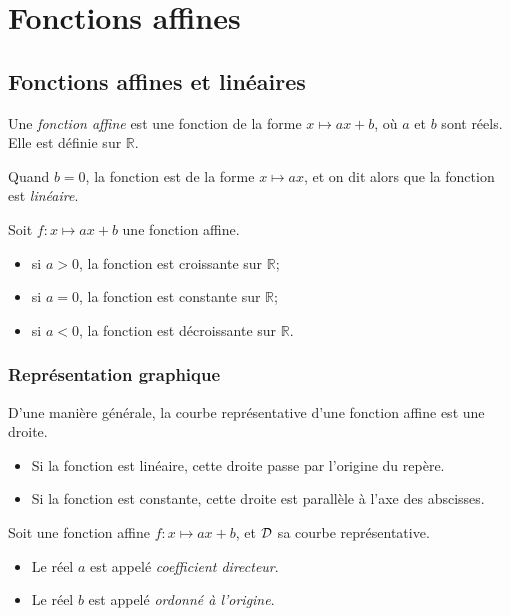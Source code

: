 \chapter{Fonctions affines}
\section{Fonctions affines et linéaires}

\begin{definition}
  Une \emph{fonction affine} est une fonction de la forme $x\mapsto ax+b$, où $a$ et $b$ sont réels. Elle est définie sur $\mathbb R$.

  Quand $b=0$, la fonction est de la forme $x\mapsto ax$, et on dit alors que la fonction est \emph{linéaire}.
\end{definition}

\begin{propriete}
  Soit $f:x\mapsto ax+b$ une fonction affine.
  \begin{itemize}
    \item si $a>0$, la fonction est croissante sur $\mathbb R$;
    \item si $a=0$, la fonction est constante sur $\mathbb R$;
    \item si $a<0$, la fonction est décroissante sur $\mathbb R$.
  \end{itemize}
\end{propriete}

\subsection{Représentation graphique}

\begin{propriete}D'une manière générale, la courbe représentative d'une
  fonction affine est une droite.

  \begin{itemize}
    \item Si la fonction est linéaire, cette droite passe par l'origine du repère.
    \item Si la fonction est constante, cette droite est parallèle à l'axe des abscisses.
    \end{itemize}
\end{propriete}

\begin{definition}Soit une fonction affine $f:x\mapsto ax+b$, et $\cal D$ sa courbe représentative.
  \begin{itemize}
    \item Le réel $a$ est appelé \emph{coefficient directeur}.
    \item Le réel $b$ est appelé \emph{ordonné à l'origine}.
  \end{itemize}
\end{definition}

